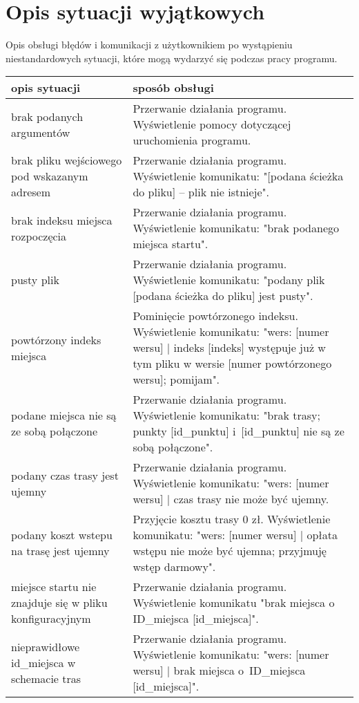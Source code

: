\documentclass{article}
\begin{document}
\newpage
\section{Opis sytuacji wyjątkowych}
Opis obsługi błędów i komunikacji z użytkownikiem po wystąpieniu niestandardowych sytuacji, które mogą wydarzyć się podczas pracy programu.
\vspace{10pt}

\begin{sloppypar}
\begin{spacing}{1.2}
\begin{longtable}{| p{0.35\linewidth} | p{0.65\linewidth}|} \hline
\textbf{opis sytuacji}   &   \textbf{sposób obsługi} \\ \hline \hline
brak podanych argumentów & Przerwanie działania programu. Wyświetlenie pomocy dotyczącej uruchomienia programu. \\ \hline
brak pliku wejściowego pod wskazanym adresem &   Przerwanie działania programu. Wyświetlenie komunikatu: "[podana ścieżka do pliku] -- plik nie istnieje". \\ \hline
brak indeksu miejsca rozpoczęcia & Przerwanie działania programu. Wyświetlenie komunikatu: "brak podanego miejsca startu".\\ \hline
pusty plik  & Przerwanie działania programu. Wyświetlenie komunikatu: "podany plik [podana ścieżka do pliku] jest pusty".  \\ \hline
powtórzony indeks miejsca & Pominięcie powtórzonego indeksu. Wyświetlenie komunikatu: "wers: [numer wersu] | indeks [indeks] występuje już w tym pliku w wersie [numer powtórzonego wersu]; pomijam". \\ \hline
podane miejsca nie są ze sobą połączone &  Przerwanie działania programu. Wyświetlenie komunikatu: "brak trasy; punkty [id\_punktu] i~[id\_punktu] nie są ze sobą połączone".\\ \hline
podany czas trasy jest ujemny & Przerwanie działania programu. Wyświetlenie komunikatu: "wers: [numer wersu] | czas trasy nie może być ujemny.\\ \hline
podany koszt wstepu na trasę jest ujemny & Przyjęcie kosztu trasy 0 zł. Wyświetlenie komunikatu: "wers: [numer wersu] | opłata wstępu nie może być ujemna; przyjmuję wstęp darmowy".\\ \hline
miejsce startu nie znajduje się w pliku konfiguracyjnym &  Przerwanie działania programu. Wyświetlenie komunikatu "brak miejsca o ID\_miejsca [id\_miejsca]". \\ \hline
nieprawidłowe id\_miejsca w schemacie tras &  Przerwanie działania programu. Wyświetlenie komunikatu: "wers: [numer wersu] | brak miejsca o~ID\_miejsca [id\_miejsca]".\\ \hline
\end{longtable}
\end{spacing}
\end{sloppypar}
\end{document}
